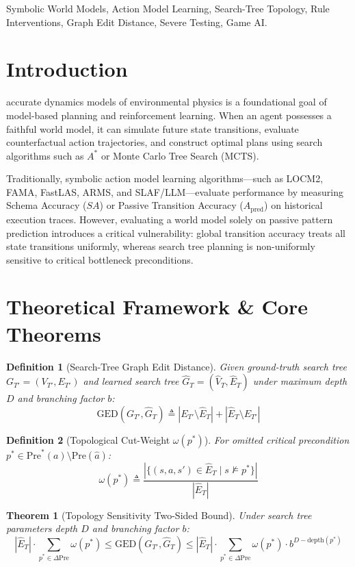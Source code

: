 \documentclass[journal]{IEEEtran}
\newtheorem{theorem}{Theorem}
\newtheorem{definition}{Definition}
\begin{document}
\begin{IEEEkeywords}
Symbolic World Models, Action Model Learning, Search-Tree Topology, Rule Interventions, Graph Edit Distance, Severe Testing, Game AI.
\end{IEEEkeywords}

\section{Introduction}
 accurate dynamics models of environmental physics is a foundational goal of model-based planning and reinforcement learning. When an agent possesses a faithful world model, it can simulate future state transitions, evaluate counterfactual action trajectories, and construct optimal plans using search algorithms such as $A^*$ or Monte Carlo Tree Search (MCTS).

Traditionally, symbolic action model learning algorithms—such as LOCM2, FAMA, FastLAS, ARMS, and SLAF/LLM—evaluate performance by measuring Schema Accuracy ($SA$) or Passive Transition Accuracy ($A_{\text{pred}}$) on historical execution traces. However, evaluating a world model solely on passive pattern prediction introduces a critical vulnerability: global transition accuracy treats all state transitions uniformly, whereas search tree planning is non-uniformly sensitive to critical bottleneck preconditions.

\section{Theoretical Framework \& Core Theorems}

\begin{definition}[Search-Tree Graph Edit Distance]
Given ground-truth search tree $G_{T'} = (V_{T'}, E_{T'})$ and learned search tree $\hat{G}_T = (\hat{V}_T, \hat{E}_T)$ under maximum depth $D$ and branching factor $b$:
$$\text{GED}(G_{T'}, \hat{G}_T) \triangleq |E_{T'} \setminus \hat{E}_T| + |\hat{E}_T \setminus E_{T'}|$$
\end{definition}

\begin{definition}[Topological Cut-Weight $\omega(p^*)$]
For omitted critical precondition $p^* \in \text{Pre}^*(a) \setminus \text{Pre}(\hat{a})$:
$$\omega(p^*) \triangleq \frac{|\{(s, a, s') \in \hat{E}_T \mid s \not\models p^*\}|}{|\hat{E}_T|}$$
\end{definition}

\begin{theorem}[Topology Sensitivity Two-Sided Bound]
Under search tree parameters depth $D$ and branching factor $b$:
$$|\hat{E}_T| \cdot \sum_{p^* \in \Delta \text{Pre}} \omega(p^*) \le \text{GED}(G_{T'}, \hat{G}_T) \le |\hat{E}_T| \cdot \sum_{p^* \in \Delta \text{Pre}} \omega(p^*) \cdot b^{D - \text{depth}(p^*)}$$
\end{theorem}
\end{document}
